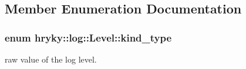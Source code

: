 \subsection{Member Enumeration Documentation}
\hypertarget{classhryky_1_1log_1_1_level_a9e6bba8f272859b212f49e4478a863d7}{
\subsubsection[{kind\-\_\-type}]{\setlength{\rightskip}{0pt plus 5cm}enum {\bf hryky\-::log\-::\-Level\-::kind\-\_\-type}}}\label{classhryky_1_1log_1_1_level_a9e6bba8f272859b212f49e4478a863d7}


raw value of the log level. 

